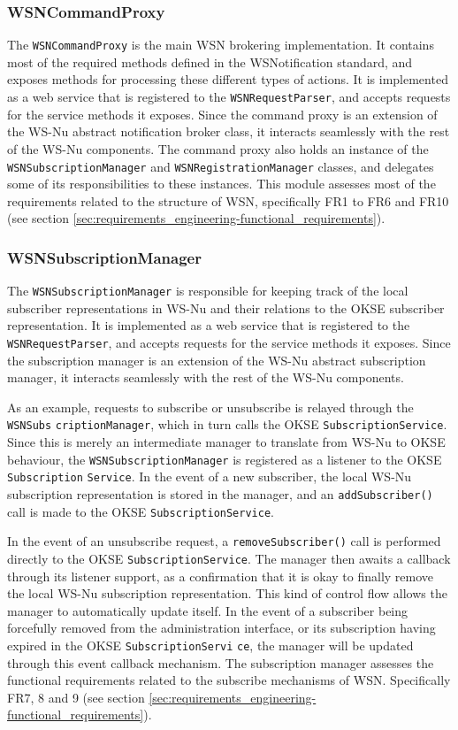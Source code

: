 \subsubsection{WSNCommandProxy}

The \verb!WSNCommandProxy! is the main WSN brokering implementation. It contains most of the required methods defined in the WSNotification standard, and exposes methods for processing these different types of actions. It is implemented as a web service that is registered to the \verb!WSNRequestParser!, and accepts requests for the service methods it exposes. Since the command proxy is an extension of the WS-Nu abstract notification broker class, it interacts seamlessly with the rest of the WS-Nu components. The command proxy also holds an instance of the \verb!WSNSubscriptionManager! and \verb!WSNRegistrationManager! classes, and delegates some of its responsibilities to these instances. This module assesses most of the requirements related to the structure of WSN, specifically FR1 to FR6 and FR10 (see section \ref{sec:requirements_engineering-functional_requirements}).

\subsubsection{WSNSubscriptionManager}

The \verb!WSNSubscriptionManager! is responsible for keeping track of the local subscriber representations in WS-Nu and their relations to the OKSE subscriber representation. It is implemented as a web service that is registered to the \verb!WSNRequestParser!, and accepts requests for the service methods it exposes. Since the subscription manager is an extension of the WS-Nu abstract subscription manager, it interacts seamlessly with the rest of the WS-Nu components.

As an example, requests to subscribe or unsubscribe is relayed through the \verb!WSNSubs! \verb!criptionManager!, which in turn calls the OKSE \verb!Subscription!\verb!Service!. Since this is merely an intermediate manager to translate from WS-Nu to OKSE behaviour, the \verb!WSNSubscriptionManager! is registered as a listener to the OKSE \verb!Subscription! \verb!Service!. In the event of a new subscriber, the local WS-Nu subscription representation is stored in the manager, and an \verb!addSubscriber()! call is made to the OKSE \verb!SubscriptionService!.

In the event of an unsubscribe request, a \verb!removeSubscriber()! call is performed directly to the OKSE \verb!SubscriptionService!. The manager then awaits a callback through its listener support, as a confirmation that it is okay to finally remove the local WS-Nu subscription representation.
This kind of control flow allows the manager to automatically update itself. 
In the event of a subscriber being forcefully removed from the administration interface, or its subscription having expired in the OKSE \verb!SubscriptionServi! \verb!ce!, the manager will be updated through this event callback mechanism.
The subscription manager assesses the functional requirements related to the subscribe mechanisms of WSN. Specifically FR7, 8 and 9 (see section \ref{sec:requirements_engineering-functional_requirements}).

